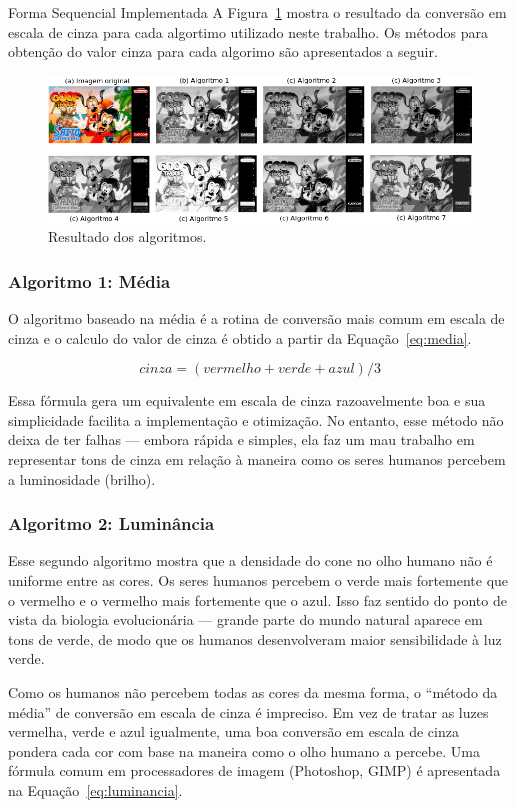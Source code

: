\begin{subsection}{Forma Sequencial Implementada}
A Figura~\ref{fig:example} mostra o resultado da conversão em escala de cinza
para cada algortimo utilizado neste trabalho.  Os métodos para obtenção do valor
cinza para cada algorimo são apresentados a seguir.

\begin{figure}[!h]
	\centering
	\includegraphics[width=0.95\linewidth]{figs/gray.png}
	\caption{Resultado dos algoritmos.}
	\label{fig:example}
\end{figure}

\subsubsection{Algoritmo 1: Média}
O algoritmo baseado na média é a rotina de conversão mais comum em escala de
cinza e o calculo do valor de cinza é obtido a partir da Equação~\ref{eq:media}.

\begin{equation}
\label{eq:media}
cinza = (vermelho + verde + azul)/3
\end{equation}

Essa fórmula gera um equivalente em escala de cinza razoavelmente boa e sua
simplicidade facilita a implementação e otimização. No entanto, esse método não
deixa de ter falhas --- embora rápida e simples, ela faz um mau trabalho em
representar tons de cinza em relação à maneira como os seres humanos percebem a
luminosidade (brilho).


\subsubsection{Algoritmo 2: Luminância}
Esse segundo algoritmo mostra que a densidade do cone no olho humano não é
uniforme entre as cores. Os seres humanos percebem o verde mais fortemente que o
vermelho e o vermelho mais fortemente que o azul. Isso faz sentido do ponto de
vista da biologia evolucionária --- grande parte do mundo natural aparece em
tons de verde, de modo que os humanos desenvolveram maior sensibilidade à luz
verde.

Como os humanos não percebem todas as cores da mesma forma, o ``método da média'' de
conversão em escala de cinza é impreciso. Em vez de tratar as luzes vermelha,
verde e azul igualmente, uma boa conversão em escala de cinza pondera cada cor
com base na maneira como o olho humano a percebe. Uma fórmula comum em
processadores de imagem (Photoshop, GIMP) é apresentada na
Equação~\ref{eq:luminancia}.



\end{subsection}
